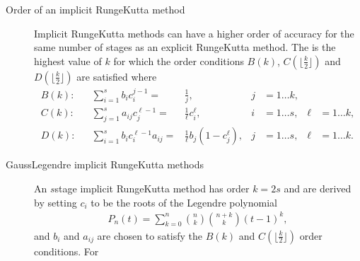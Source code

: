 \documentclass[letterpaper,10pt,english]{jupyterBook}
\begin{document}
\begin{description}
\item[{Order of an implicit Runge\sphinxhyphen{}Kutta method\label{\detokenize{8_Appendices/8.0_Cheat_sheet:term-Order-of-an-implicit-Runge-Kutta-method}}}] \leavevmode
\sphinxAtStartPar
Implicit Runge\sphinxhyphen{}Kutta methods can have a higher order of accuracy for the same number of stages as an explicit Runge\sphinxhyphen{}Kutta method. The {\hyperref[\detokenize{3_IRKs/3.0_IRKs:order-of-irk-section}]{}} is the highest value of \(k\) for which the order conditions \(B(k)\), \(C(\lfloor \frac{k}{2} \rfloor)\) and \(D(\lfloor \frac{k}{2} \rfloor)\) are satisfied where
\begin{align*}
    B(k): && \sum_{i=1}^s b_i c_i^{j-1} = & \frac{1}{j}, & j&=1\ldots k, \\
    C(k): && \sum_{j=1}^s a_{ij} c_j^{\ell-1} = & \frac{1}{\ell}c_i^{\ell} , & i&=1 \ldots s, & \ell &=1 \ldots k,\\
    D(k): && \sum_{i=1}^s b_i c_i^{\ell-1} a_{ij} = & \frac{1}{\ell}b_j (1-c_j^{\ell}), & j&=1 \ldots s, & \ell &=1 \ldots k.
\end{align*}
\item[{Gauss\sphinxhyphen{}Legendre implicit Runge\sphinxhyphen{}Kutta methods\label{\detokenize{8_Appendices/8.0_Cheat_sheet:term-Gauss-Legendre-implicit-Runge-Kutta-methods}}}] \leavevmode
\sphinxAtStartPar
An \(s\)\sphinxhyphen{}stage {\hyperref[\detokenize{3_IRKs/3.1_Deriving_IRK_methods:gauss-legendre-derivation}]{}} implicit Runge\sphinxhyphen{}Kutta method has order \(k = 2s\) and are derived by setting \(c_i\) to be the roots of the Legendre polynomial
\begin{equation*}
\begin{split}P_n(t) = \displaystyle\sum_{k=0}^n \binom{n}{k} \binom{n+k}{k} (t - 1)^k,\end{split}
\end{equation*}
\sphinxAtStartPar
and \(b_i\) and \(a_{ij}\) are chosen to satisfy the \(B(k)\) and \(C(\lfloor \frac{k}{2} \rfloor)\) order conditions. For


\end{description}
\end{document}
